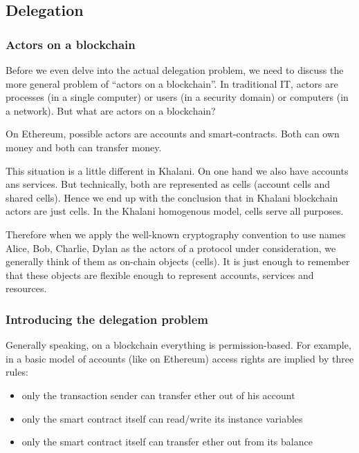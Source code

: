 \documentclass[a4paper]{article}
\begin{document}
\subsection{Delegation}

\subsubsection{Actors on a blockchain}

Before we even delve into the actual delegation problem, we need to discuss the more general problem of ``actors on a blockchain''. In traditional IT, actors are processes (in a single computer) or users (in a security domain) or computers (in a network). But what are actors on a blockchain?

On Ethereum, possible actors are accounts and smart-contracts. Both can own money and both can transfer money.

This situation is a little different in Khalani. On one hand we also have accounts ans services. But technically, both are represented as cells (account cells and shared cells). Hence we end up with the conclusion that in Khalani blockchain actors are just cells. In the Khalani homogenous model, cells serve all purposes.

Therefore when we apply the well-known cryptography convention to use names Alice, Bob, Charlie, Dylan as the actors of a protocol under consideration, we generally think of them as on-chain objects (cells). It is just enough to remember that these objects are flexible enough to represent accounts, services and resources.

\subsubsection{Introducing the delegation problem}

Generally speaking, on a blockchain everything is permission-based. For example, in a basic model of accounts (like on Ethereum) access rights are implied by three rules:

\begin{itemize}
  \item only the transaction sender can transfer ether out of his account
  \item only the smart contract itself can read/write its instance variables
  \item only the smart contract itself can transfer ether out from its balance
\end{itemize}
\end{document}
